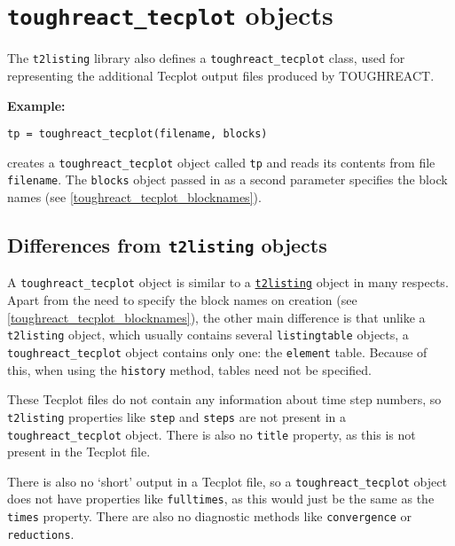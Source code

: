 \section{\texttt{toughreact\_tecplot} objects}
\label{toughreact_tecplot}

The \texttt{t2listing} library also defines a \texttt{toughreact\_tecplot} class, used for representing the additional Tecplot output files produced by TOUGHREACT.

\textbf{Example:}

\begin{lstlisting}
tp = toughreact_tecplot(filename, blocks)
\end{lstlisting}

creates a \texttt{toughreact\_tecplot} object called \texttt{tp} and reads its contents from file \texttt{filename}. The \texttt{blocks} object passed in as a second parameter specifies the block names (see \ref{toughreact_tecplot_blocknames}).

\subsection{Differences from \texttt{t2listing} objects}

A \texttt{toughreact\_tecplot} object is similar to a \hyperref[listingfiles]{\texttt{t2listing}} object in many respects. Apart from the need to specify the block names on creation (see \ref{toughreact_tecplot_blocknames}), the other main difference is that unlike a \texttt{t2listing} object, which usually contains several \texttt{listingtable} objects, a \texttt{toughreact\_tecplot} object contains only one: the \texttt{element} table. Because of this, when using the \texttt{history} method, tables need not be specified.

These Tecplot files do not contain any information about time step numbers, so \texttt{t2listing} properties like \texttt{step} and \texttt{steps} are not present in a \texttt{toughreact\_tecplot} object. There is also no \texttt{title} property, as this is not present in the Tecplot file.

There is also no `short' output in a Tecplot file, so a \texttt{toughreact\_tecplot} object does not have properties like \texttt{fulltimes}, as this would just be the same as the \texttt{times} property. There are also no diagnostic methods like \texttt{convergence} or \texttt{reductions}.

